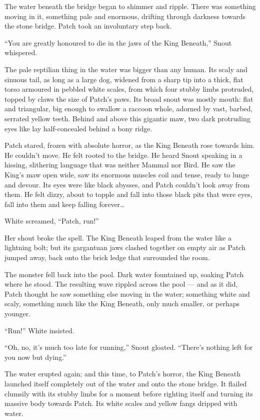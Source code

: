 \documentclass[ebook,oneside,openany,17pt]{memoir}
\newenvironment{tolerant}[1]{%
  \par\tolerance=#1\relax
}{%
  \par
}
\begin{document}
The water beneath the bridge began to shimmer and ripple. There was
something moving in it, something pale and enormous, drifting through
darkness towards the stone bridge. Patch took an involuntary step
back.

“You are greatly honoured to die in the jaws of the King Beneath,”
Snout whispered.

The pale reptilian thing in the water was bigger than any human. Its
scaly and sinuous tail, as long as a large dog, widened from a sharp
tip into a thick, flat torso armoured in pebbled white scales, from
which four stubby limbs protruded, topped by claws the size of Patch’s
paws. Its broad snout was mostly mouth: flat and triangular, big
enough to swallow a raccoon whole, adorned by vast, barbed, serrated
yellow teeth. Behind and above this gigantic maw, two dark protruding
eyes like lay half-concealed behind a bony ridge.

Patch stared, frozen with absolute horror, as the King Beneath rose
towards him. He couldn’t move. He felt rooted to the bridge. He heard
Snout speaking in a hissing, slithering language that was neither
Mammal nor Bird. He saw the King’s maw open wide, saw its enormous
muscles coil and tense, ready to lunge and devour. Its eyes were like
black abysses, and Patch couldn’t look away from them. He felt dizzy,
about to topple and fall into those black pits that were eyes, fall
into them and keep falling forever…

White screamed, “Patch, run!”

\begin{tolerant}{500}
Her shout broke the spell. The King Beneath leap\-ed from the water like
a lightning bolt; but its gargantuan jaws clashed together on empty
air as Patch jumped away, back onto the brick ledge that surrounded
the room.
\end{tolerant}

The monster fell back into the pool. Dark water fountained up, soaking
Patch where he stood. The resulting wave rippled across the pool — and
as it did, Patch thought he saw something else moving in the water;
something white and scaly, something much like the King Beneath, only
much smaller, or perhaps younger.

“Run!” White insisted.

“Oh, no, it’s much too late for running,” Snout gloated. “There’s
nothing left for you now but dying.”

The water erupted again; and this time, to Patch’s horror, the King
Beneath launched itself completely out of the water and onto the stone
bridge. It flailed clumsily with its stubby limbs for a moment before
righting itself and turning its massive body towards Patch. Its white
scales and yellow fangs dripped with water.
\end{document}
